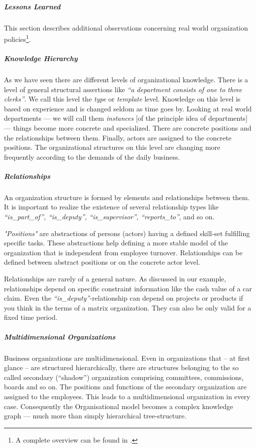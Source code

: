 \subparagraph{Lessons Learned}

This section describes additional observations concerning real world organization policies\footnote{A complete overview can be found in \cite{Schaller98}.}.

\subparagraph{Knowledge Hierarchy}

As we have seen there are different levels of organizational knowledge. There is a level of general structural assertions like \textit{``a department consists of one to three clerks''}. We call this level the \emph{type} or \emph{template} level. Knowledge on this level is based on experience and is changed seldom as time goes by. Looking at real world departments --- we will call them \emph{instances} [of the principle idea of departments] --- things become more concrete and specialized. There are concrete positions and the relationships between them. Finally, actors are assigned to the concrete positions. The organizational structures on this level are changing more frequently according to the demands of the daily business.

\subparagraph{Relationships}

An organization structure is formed by elements and relationships between them. It is important to realize the existence of several relationship types like \textit{``is\_part\_of'', ``is\_deputy'', ``is\_supervisor'', ``reports\_to''}, and so on.

\textit{"Positions"} are abstractions of persons (actors) having a defined skill-set fulfilling specific tasks. These abstractions help defining a more stable model of the organization that is independent from employee turnover. Relationships can be defined between abstract positions or on the concrete actor level.

Relationships are rarely of a general nature. As discussed in our example, relationships depend on specific constraint information like the cash value of a car claim. Even the \textit{``is\_deputy''}-relationship can depend on projects or products if you think in the terms of a matrix organization. They can also be only valid for a fixed time period.

\subparagraph{Multidimensional Organizations}

Business organizations are multidimensional. Even in organizations that -- at first glance -- are structured hierarchically, there are structures belonging to the so called secondary (``shadow'') organization comprising committees, commissions, boards and so on. The positions and functions of the secondary organization are assigned to the employees. This leads to a multidimensional organization in every case. Consequently the Organisational model becomes a complex knowledge graph --- much more than simply hierarchical tree-structure. %


